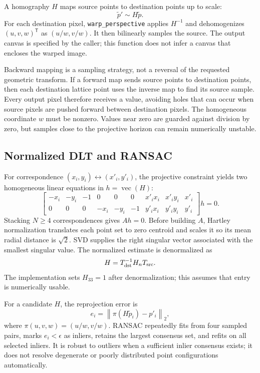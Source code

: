 \documentclass[11pt,a4paper]{article}
\newcommand{\1}{\mathbf{1}}
\begin{document}
A homography $H$ maps source points to destination points up to scale:
\[
  \tilde p'\sim H\tilde p.
\]
For each destination pixel, \texttt{warp\_perspective} applies $H^{-1}$ and dehomogenizes
$(u,v,w)^{\mathsf T}$ as $(u/w,v/w)$. It then bilinearly samples the source.
The output canvas is specified by the caller; this function does not infer a
canvas that encloses the warped image.

Backward mapping is a sampling strategy, not a reversal of the requested
geometric transform. If a forward map sends source points to destination
points, then each destination lattice point uses the inverse map to find its
source sample. Every output pixel therefore receives a value, avoiding holes
that can occur when source pixels are pushed forward between destination
pixels. The homogeneous coordinate $w$ must be nonzero. Values near zero are
guarded against division by zero, but samples close to the projective horizon
can remain numerically unstable.

\subsection{Normalized DLT and RANSAC}

For correspondence $(x_i,y_i)\leftrightarrow(x'_i,y'_i)$, the projective
constraint yields two homogeneous linear equations in $h=\operatorname{vec}(H)$:
\[
\begin{bmatrix}-x_i&-y_i&-1&0&0&0&x'_ix_i&x'_iy_i&x'_i\\
0&0&0&-x_i&-y_i&-1&y'_ix_i&y'_iy_i&y'_i\end{bmatrix}h=0.
\]
Stacking $N\ge4$ correspondences gives $Ah=0$. Before building $A$, Hartley
normalization translates each point set to zero centroid and scales it so its
mean radial distance is $\sqrt{2}$. SVD supplies the right singular vector
associated with the smallest singular value. The normalized estimate is
denormalized as
\[
  H=T_{\rm dst}^{-1}H_nT_{\rm src}.
\]
The implementation sets $H_{33}=1$ after denormalization; this assumes that
entry is numerically usable.

For a candidate $H$, the reprojection error is
\[
 e_i=\left\|\pi(H\tilde p_i)-p'_i\right\|_2,
\]
where $\pi(u,v,w)=(u/w,v/w)$. RANSAC repeatedly fits from four sampled pairs,
marks $e_i<\epsilon$ as inliers, retains the largest consensus set, and refits
on all selected inliers. It is robust to outliers when a sufficient inlier
consensus exists; it does not resolve degenerate or poorly distributed point
configurations automatically.
\end{document}

